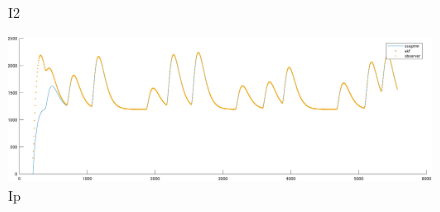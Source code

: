 \documentclass[platex]{jsarticle}
\begin{document}
\begin{figure}[H]
\begin{minipage}{0.65\columnwidth}
     \caption{I2}
     \label{fig:old002i2}
  \end{minipage}
%
  \begin{minipage}{0.65\columnwidth}
     \centering
     \includegraphics[width=\columnwidth]{fig/old002ip.pdf}
     \caption{Ip}
     \label{fig:old002ip}
  \end{minipage}
\end{figure}
\end{document}
